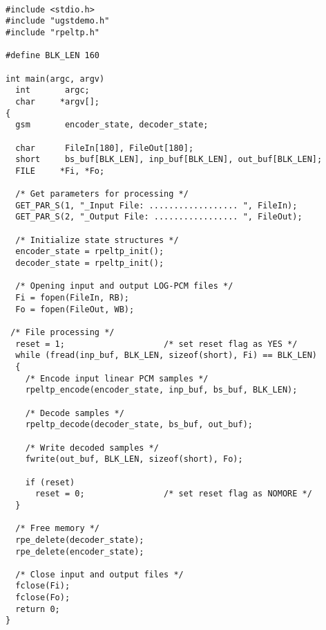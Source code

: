 {\tt\small
\begin{verbatim}
#include <stdio.h>
#include "ugstdemo.h"
#include "rpeltp.h"

#define BLK_LEN 160

int main(argc, argv)
  int       argc;
  char     *argv[];
{
  gsm       encoder_state, decoder_state;

  char      FileIn[180], FileOut[180];
  short     bs_buf[BLK_LEN], inp_buf[BLK_LEN], out_buf[BLK_LEN];
  FILE     *Fi, *Fo;

  /* Get parameters for processing */
  GET_PAR_S(1, "_Input File: .................. ", FileIn);
  GET_PAR_S(2, "_Output File: ................. ", FileOut);

  /* Initialize state structures */
  encoder_state = rpeltp_init();
  decoder_state = rpeltp_init();

  /* Opening input and output LOG-PCM files */
  Fi = fopen(FileIn, RB);
  Fo = fopen(FileOut, WB);

 /* File processing */
  reset = 1;                    /* set reset flag as YES */
  while (fread(inp_buf, BLK_LEN, sizeof(short), Fi) == BLK_LEN)
  {
    /* Encode input linear PCM samples */
    rpeltp_encode(encoder_state, inp_buf, bs_buf, BLK_LEN);

    /* Decode samples */
    rpeltp_decode(decoder_state, bs_buf, out_buf);

    /* Write decoded samples */
    fwrite(out_buf, BLK_LEN, sizeof(short), Fo);

    if (reset)
      reset = 0;                /* set reset flag as NOMORE */
  }

  /* Free memory */
  rpe_delete(decoder_state);
  rpe_delete(encoder_state);

  /* Close input and output files */
  fclose(Fi);
  fclose(Fo);
  return 0;
}
\end{verbatim}
}
